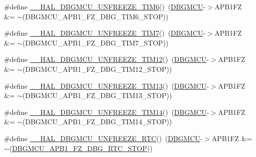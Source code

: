\begin{DoxyCompactItemize}
\item 
\#define \hyperlink{group___h_a_l___exported___macros_gaab127b51706a565b72c397e29b145234}{\+\_\+\+\_\+\+H\+A\+L\+\_\+\+D\+B\+G\+M\+C\+U\+\_\+\+U\+N\+F\+R\+E\+E\+Z\+E\+\_\+\+T\+I\+M6}()~(\hyperlink{group___peripheral__declaration_ga92ec6d9ec2251fda7d4ce09748cd74b4}{D\+B\+G\+M\+CU}-\/$>$A\+P\+B1\+FZ \&= $\sim$(D\+B\+G\+M\+C\+U\+\_\+\+A\+P\+B1\+\_\+\+F\+Z\+\_\+\+D\+B\+G\+\_\+\+T\+I\+M6\+\_\+\+S\+T\+OP))
\item 
\#define \hyperlink{group___h_a_l___exported___macros_ga4a6c5081b976583921ac5d140e15bb85}{\+\_\+\+\_\+\+H\+A\+L\+\_\+\+D\+B\+G\+M\+C\+U\+\_\+\+U\+N\+F\+R\+E\+E\+Z\+E\+\_\+\+T\+I\+M7}()~(\hyperlink{group___peripheral__declaration_ga92ec6d9ec2251fda7d4ce09748cd74b4}{D\+B\+G\+M\+CU}-\/$>$A\+P\+B1\+FZ \&= $\sim$(D\+B\+G\+M\+C\+U\+\_\+\+A\+P\+B1\+\_\+\+F\+Z\+\_\+\+D\+B\+G\+\_\+\+T\+I\+M7\+\_\+\+S\+T\+OP))
\item 
\#define \hyperlink{group___h_a_l___exported___macros_gaa8e882be8db24537679bc0d4a129f448}{\+\_\+\+\_\+\+H\+A\+L\+\_\+\+D\+B\+G\+M\+C\+U\+\_\+\+U\+N\+F\+R\+E\+E\+Z\+E\+\_\+\+T\+I\+M12}()~(\hyperlink{group___peripheral__declaration_ga92ec6d9ec2251fda7d4ce09748cd74b4}{D\+B\+G\+M\+CU}-\/$>$A\+P\+B1\+FZ \&= $\sim$(D\+B\+G\+M\+C\+U\+\_\+\+A\+P\+B1\+\_\+\+F\+Z\+\_\+\+D\+B\+G\+\_\+\+T\+I\+M12\+\_\+\+S\+T\+OP))
\item 
\#define \hyperlink{group___h_a_l___exported___macros_ga00b605f660d43ab1b833926dabe352fe}{\+\_\+\+\_\+\+H\+A\+L\+\_\+\+D\+B\+G\+M\+C\+U\+\_\+\+U\+N\+F\+R\+E\+E\+Z\+E\+\_\+\+T\+I\+M13}()~(\hyperlink{group___peripheral__declaration_ga92ec6d9ec2251fda7d4ce09748cd74b4}{D\+B\+G\+M\+CU}-\/$>$A\+P\+B1\+FZ \&= $\sim$(D\+B\+G\+M\+C\+U\+\_\+\+A\+P\+B1\+\_\+\+F\+Z\+\_\+\+D\+B\+G\+\_\+\+T\+I\+M13\+\_\+\+S\+T\+OP))
\item 
\#define \hyperlink{group___h_a_l___exported___macros_gaa62a0abc610b769d15fd9d20bdc14cd7}{\+\_\+\+\_\+\+H\+A\+L\+\_\+\+D\+B\+G\+M\+C\+U\+\_\+\+U\+N\+F\+R\+E\+E\+Z\+E\+\_\+\+T\+I\+M14}()~(\hyperlink{group___peripheral__declaration_ga92ec6d9ec2251fda7d4ce09748cd74b4}{D\+B\+G\+M\+CU}-\/$>$A\+P\+B1\+FZ \&= $\sim$(D\+B\+G\+M\+C\+U\+\_\+\+A\+P\+B1\+\_\+\+F\+Z\+\_\+\+D\+B\+G\+\_\+\+T\+I\+M14\+\_\+\+S\+T\+OP))
\item 
\#define \hyperlink{group___h_a_l___exported___macros_ga3d85d5cda1979c7df426634a1d3d7d35}{\+\_\+\+\_\+\+H\+A\+L\+\_\+\+D\+B\+G\+M\+C\+U\+\_\+\+U\+N\+F\+R\+E\+E\+Z\+E\+\_\+\+R\+TC}()~(\hyperlink{group___peripheral__declaration_ga92ec6d9ec2251fda7d4ce09748cd74b4}{D\+B\+G\+M\+CU}-\/$>$A\+P\+B1\+FZ \&= $\sim$(\hyperlink{group___peripheral___registers___bits___definition_ga1e20246d389229ff46006b405bb56b1d}{D\+B\+G\+M\+C\+U\+\_\+\+A\+P\+B1\+\_\+\+F\+Z\+\_\+\+D\+B\+G\+\_\+\+R\+T\+C\+\_\+\+S\+T\+OP}))

\end{DoxyCompactItemize}
